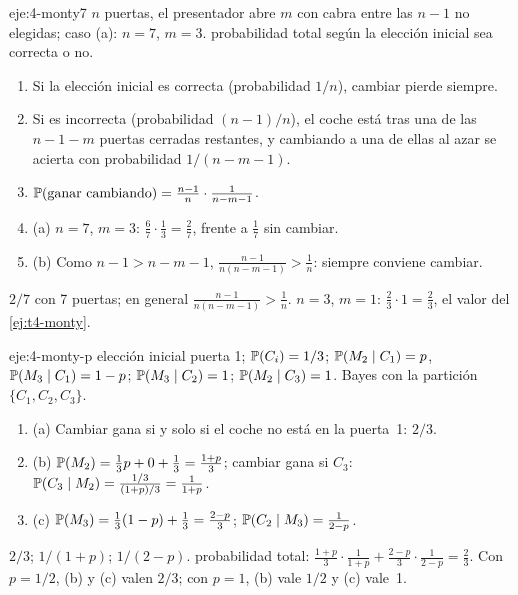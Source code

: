 \begin{solucion}{eje:4-monty7}
\datos $n$ puertas, el presentador abre $m$ con cabra entre las $n-1$ no elegidas; caso (a): $n=7$, $m=3$.
\planteamiento probabilidad total según la elección inicial sea correcta o no.
\pasos
\begin{enumerate}[label=\arabic*.]
  \item Si la elección inicial es correcta (probabilidad $1/n$), cambiar pierde siempre.
  \item Si es incorrecta (probabilidad $(n-1)/n$), el coche está tras una de las $n-1-m$ puertas cerradas restantes, y cambiando a una de ellas al azar se acierta con probabilidad $1/(n-m-1)$.
  \item $\mathbb{P}(\text{ganar cambiando})=\frac{n-1}{n}\cdot\frac{1}{n-m-1}$.
  \item (a) $n=7$, $m=3$: $\frac67\cdot\frac13=\frac27$, frente a $\frac17$ sin cambiar.
  \item (b) Como $n-1>n-m-1$, $\frac{n-1}{n(n-m-1)}>\frac1n$: siempre conviene cambiar.
\end{enumerate}
\resultado $2/7$ con 7 puertas; en general $\frac{n-1}{n(n-m-1)}>\frac1n$.
\comprobacion $n=3$, $m=1$: $\frac23\cdot1=\frac23$, el valor del \cref{ej:t4-monty}.
\end{solucion}

\begin{solucion}{eje:4-monty-p}
\datos elección inicial puerta 1; $\mathbb{P}(C_i)=1/3$; $\mathbb{P}(M_2\mid C_1)=p$, $\mathbb{P}(M_3\mid C_1)=1-p$; $\mathbb{P}(M_3\mid C_2)=1$; $\mathbb{P}(M_2\mid C_3)=1$.
\planteamiento Bayes con la partición $\{C_1,C_2,C_3\}$.
\pasos
\begin{enumerate}[label=\arabic*.]
  \item (a) Cambiar gana si y solo si el coche no está en la puerta~1: $2/3$.
  \item (b) $\mathbb{P}(M_2)=\frac13p+0+\frac13=\frac{1+p}3$; cambiar gana si $C_3$: $\mathbb{P}(C_3\mid M_2)=\frac{1/3}{(1+p)/3}=\frac1{1+p}$.
  \item (c) $\mathbb{P}(M_3)=\frac13(1-p)+\frac13=\frac{2-p}3$; $\mathbb{P}(C_2\mid M_3)=\frac1{2-p}$.
\end{enumerate}
\resultado $2/3$; $1/(1+p)$; $1/(2-p)$.
\comprobacion probabilidad total: $\frac{1+p}3\cdot\frac1{1+p}+\frac{2-p}3\cdot\frac1{2-p}=\frac23$. Con $p=1/2$, (b) y (c) valen $2/3$; con $p=1$, (b) vale $1/2$ y (c) vale~1.
\end{solucion}


